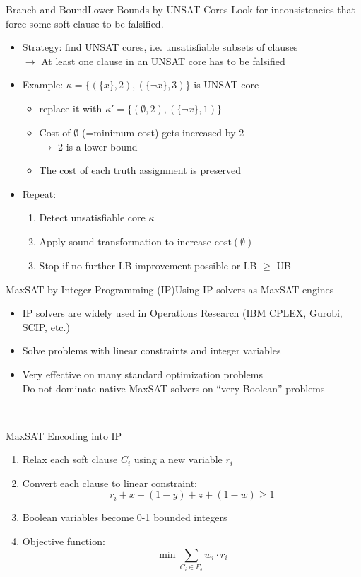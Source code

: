 \documentclass[t,english]{sdqbeamer}
\begin{document}
\begin{frame}{Branch and Bound}{Lower Bounds by UNSAT Cores}
Look for inconsistencies that force some soft clause to be falsified.\\[1em]
\begin{itemize}\itemsep1em
	\item Strategy: find UNSAT cores, i.e. unsatisfiable subsets of clauses\\
	$\longrightarrow$ At least one clause in an UNSAT core has to be falsified
	\item Example: $\kappa = \{(\{x\},2), (\{\lnot x\}, 3)\}$ is UNSAT core\\[1ex]
	\begin{itemize}\itemsep1em
		\item replace it with $\kappa' = \{(\emptyset, 2), (\{\lnot x\}, 1)\}$
		\item Cost of $\emptyset$ (=minimum cost) gets increased by 2\\
			$\longrightarrow$ 2 is a lower bound
		\item The cost of each truth assignment is preserved
	\end{itemize}
	\item Repeat:\\[1ex]
	\begin{enumerate}\itemsep1ex
		\item Detect unsatisfiable core $\kappa$
		\item Apply sound transformation to increase $\text{cost}(\emptyset)$
		\item Stop if no further LB improvement possible or LB $\geq$ UB
	\end{enumerate}
\end{itemize}
\end{frame}

\begin{frame}{MaxSAT by Integer Programming (IP)}{Using IP solvers as MaxSAT engines}
\begin{itemize}\itemsep1ex
	\item IP solvers are widely used in Operations Research (IBM CPLEX, Gurobi, SCIP, etc.)
	\item Solve problems with linear constraints and integer variables
	\item Very effective on many standard optimization problems\\[1ex]
	Do not dominate native MaxSAT solvers on ``very Boolean'' problems
\end{itemize}~\\
\begin{block}{MaxSAT Encoding into IP}
\begin{enumerate}
	\item Relax each soft clause $C_i$ using a new variable $r_i$
	\item Convert each clause to linear constraint:
	\[
	r_i + x + (1 - y) + z + (1 - w) \geq 1
	\]
	\item Boolean variables become 0-1 bounded integers
	\item Objective function:
	\[
	\min \sum_{C_i \in F_s} w_i \cdot r_i
	\]
\end{enumerate}
\end{block}
\end{frame}
\end{document}
